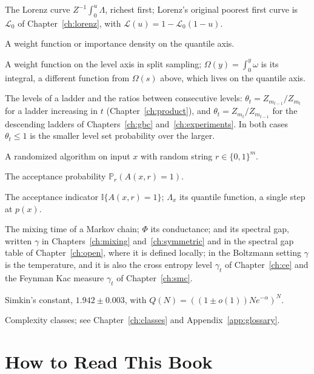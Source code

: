 \documentclass[11pt,twoside,openany]{book}
\theoremstyle{plain}
\theoremstyle{definition}
\theoremstyle{remark}
\newcommand{\PP}{\mathbb{P}}
\newcommand{\Ind}{\mathbb{I}}
\newcommand{\cL}{\mathcal{L}}
\newcommand{\RP}{\mathrm{RP}}
\newcommand{\BPP}{\mathrm{BPP}}
\newcommand{\NP}{\mathrm{NP}}
\newcommand{\Pc}{\mathrm{P}}
\begin{document}
\begin{description}[style=nextline]
\item[$\cL(u)$] The Lorenz curve $Z^{-1} \int_0^u \Lambda$, richest first; Lorenz's original poorest first curve is $\cL_0$ of Chapter~\ref{ch:lorenz}, with $\cL(u) = 1 - \cL_0(1-u)$.
\item[$\Omega(s)$] A weight function or importance density on the quantile axis.
\item[$\omega(m)$] A weight function on the level axis in split sampling; $\Omega(y) = \int_0^y \omega$ is its integral, a different function from $\Omega(s)$ above, which lives on the quantile axis.
\item[$m_t, \theta_t$] The levels of a ladder and the ratios between consecutive levels: $\theta_t = Z_{m_{t-1}} / Z_{m_t}$ for a ladder increasing in $t$ (Chapter~\ref{ch:product}), and $\theta_t = Z_{m_t} / Z_{m_{t-1}}$ for the descending ladders of Chapters~\ref{ch:gbc} and~\ref{ch:experiments}. In both cases $\theta_t \le 1$ is the smaller level set probability over the larger.
\item[$A(x, r)$] A randomized algorithm on input $x$ with random string $r \in \{0,1\}^m$.
\item[$p(x)$] The acceptance probability $\PP_r(A(x, r) = 1)$.
\item[$L_x(r)$] The acceptance indicator $\Ind\{ A(x, r) = 1 \}$; $\Lambda_x$ its quantile function, a single step at $p(x)$.
\item[$\tau$] The mixing time of a Markov chain; $\Phi$ its conductance; and its spectral gap, written $\gamma$ in Chapters~\ref{ch:mixing} and~\ref{ch:symmetric} and in the spectral gap table of Chapter~\ref{ch:open}, where it is defined locally; in the Boltzmann setting $\gamma$ is the temperature, and it is also the cross entropy level $\gamma_t$ of Chapter~\ref{ch:ce} and the Feynman Kac measure $\gamma_t$ of Chapter~\ref{ch:smc}.
\item[$\alpha$] Simkin's constant, $1.942 \pm 0.003$, with $Q(N) = ((1 \pm o(1)) N e^{-\alpha})^N$.
\item[$\Pc, \NP, \RP, \BPP$] Complexity classes; see Chapter~\ref{ch:classes} and Appendix~\ref{app:glossary}.
\end{description}

\chapter*{How to Read This Book}
\end{document}
